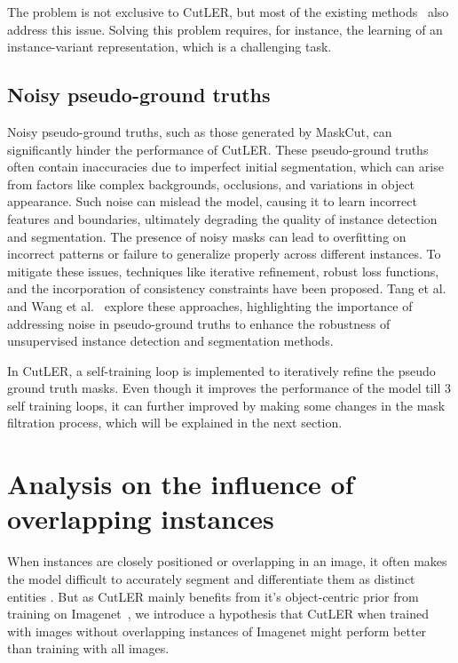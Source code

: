 The problem is not exclusive to CutLER, but most of the existing methods~\cite{engstler2023understanding, cond1_support_2, Wang_2022_CVPR} also address this issue. Solving this problem requires, for instance, the learning of an instance-variant representation, which is a challenging task.

\subsection{Noisy pseudo-ground truths}
Noisy pseudo-ground truths, such as those generated by MaskCut, can significantly hinder the performance of CutLER. These pseudo-ground truths often contain inaccuracies due to imperfect initial segmentation, which can arise from factors like complex backgrounds, occlusions, and variations in object appearance. Such noise can mislead the model, causing it to learn incorrect features and boundaries, ultimately degrading the quality of instance detection and segmentation. The presence of noisy masks can lead to overfitting on incorrect patterns or failure to generalize properly across different instances. To mitigate these issues, techniques like iterative refinement, robust loss functions, and the incorporation of consistency constraints have been proposed. Tang et al.~\cite{Tang_2018_CVPR} and Wang et al.~\cite{ziegler2022selfsupervisedlearningobjectparts} explore these approaches, highlighting the importance of addressing noise in pseudo-ground truths to enhance the robustness of unsupervised instance detection and segmentation methods.

In CutLER, a self-training loop is implemented to iteratively refine the pseudo ground truth masks. Even though it improves the performance of the model till 3 self training loops, it can further improved by making some changes in the mask filtration process, which will be explained in the next section.

\section{Analysis on the influence of overlapping instances}
\label{section:analysis_ol_instancs}
When instances are closely positioned or overlapping in an image, it often makes the model difficult to accurately segment and differentiate them as distinct entities \cite{kara2022image}. But as CutLER mainly benefits from it's object-centric prior from training on Imagenet~\cite{engstler2023understanding}, we introduce a hypothesis that CutLER when trained with images without overlapping instances of Imagenet might perform better than training with all images.

